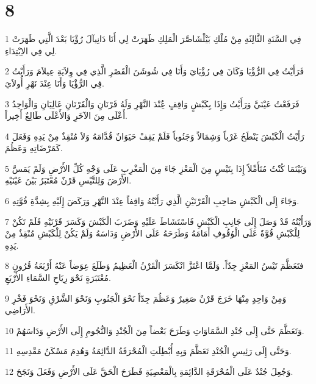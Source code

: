 \chapter{8}

\par 1 فِي السَّنَةِ الثَّالِثَةِ مِنْ مُلْكِ بَيْلْشَاصَّرَ الْمَلِكِ ظَهَرَتْ لِي أَنَا دَانِيآلَ رُؤْيَا بَعْدَ الَّتِي ظَهَرَتْ لِي فِي الاِبْتِدَاءِ.
\par 2 فَرَأَيْتُ فِي الرُّؤْيَا وَكَانَ فِي رُؤْيَايَ وَأَنَا فِي شُوشَنَ الْقَصْرِ الَّذِي فِي وِلاَيَةِ عِيلاَمَ وَرَأَيْتُ فِي الرُّؤْيَا وَأَنَا عِنْدَ نَهْرِ أُولاَيَ.
\par 3 فَرَفَعْتُ عَيْنَيَّ وَرَأَيْتُ وَإِذَا بِكَبْشٍ وَاقِفٍ عَُِنْدَ النَّهْرِ وَلَهُ قَرْنَانِ وَالْقَرْنَانِ عَالِيَانِ وَالْوَاحِدُ أَعْلَى مِنَ الآخَرِ وَالأَعْلَى طَالِعٌ أَخِيراً.
\par 4 رَأَيْتُ الْكَبْشَ يَنْطَحُ غَرْباً وَشِمَالاً وَجَنُوباً فَلَمْ يَقِفْ حَيَوَانٌ قُدَّامَهُ وَلاَ مُنْقِذٌ مِنْ يَدِهِ وَفَعَلَ كَمَرْضَاتِهِ وَعَظُمَ.
\par 5 وَبَيْنَمَا كُنْتُ مُتَأَمِّلاً إِذَا بِتَيْسٍ مِنَ الْمَعْزِ جَاءَ مِنَ الْمَغْرِبِ عَلَى وَجْهِ كُلِّ الأَرْضِ وَلَمْ يَمَسَّ الأَرْضَ وَلِلتَّيْسِ قَرْنٌ مُعْتَبَرٌ بَيْنَ عَيْنَيْهِ.
\par 6 وَجَاءَ إِلَى الْكَبْشِ صَاحِبِ الْقَرْنَيْنِ الَّذِي رَأَيْتُهُ وَاقِفاً عِنْدَ النَّهْرِ وَرَكَضَ إِلَيْهِ بِشِدَّةِ قُوَّتِهِ.
\par 7 وَرَأَيْتُهُ قَدْ وَصَلَ إِلَى جَانِبِ الْكَبْشِ فَاسْتَشَاطَ عَلَيْهِ وَضَرَبَ الْكَبْشَ وَكَسَرَ قَرْنَيْهِ فَلَمْ تَكُنْ لِلْكَبْشِ قُوَّةٌ عَلَى الْوُقُوفِ أَمَامَهُ وَطَرَحَهُ عَلَى الأَرْضِ وَدَاسَهُ وَلَمْ يَكُنْ لِلْكَبْشِ مُنْقِذٌ مِنْ يَدِهِ.
\par 8 فتَعَظَّمَ تَيْسُ المَعْزِ جِدّاً. وَلَمَّا اعْتَزَّ انْكَسَرَ الْقَرْنُ الْعَظِيمُ وَطَلَعَ عِوَضاً عَنْهُ أَرْبَعَةُ قُرُونٍ مُعْتَبَرَةٍ نَحْوَ رِيَاحِ السَّمَاءِ الأَرْبَعِ.
\par 9 وَمِنْ وَاحِدٍ مِنْهَا خَرَجَ قَرْنٌ صَغِيرٌ وَعَظُمَ جِدّاً نَحْوَ الْجَنُوبِ وَنَحْوَ الشَّرْقِ وَنَحْوَ فَخْرِ الأَرَاضِي.
\par 10 وَتَعَظَّمَ حَتَّى إِلَى جُنْدِ السَّمَاوَاتِ وَطَرَحَ بَعْضاً مِنَ الْجُنْدِ وَالنُّجُومِ إِلَى الأَرْضِ وَدَاسَهُمْ.
\par 11 وَحَتَّى إِلَى رَئِيسِ الْجُنْدِ تَعَظَّمَ وَبِهِ أُبْطِلَتِ الْمُحْرَقَةُ الدَّائِمَةُ وَهُدِمَ مَسْكَنُ مَقْدِسِهِ.
\par 12 وَجُعِلَ جُنْدٌ عَلَى الْمُحْرَقَةِ الدَّائِمَةِ بِالْمَعْصِيَةِ فَطَرَحَ الْحَقَّ عَلَى الأَرْضِ وَفَعَلَ وَنَجَحَ.
